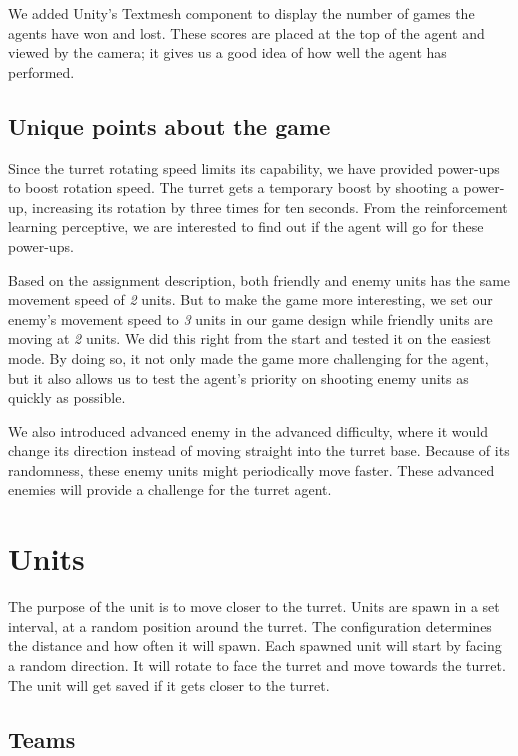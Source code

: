 \documentclass[conference]{IEEEtran}
\begin{document}
We added Unity's Textmesh component to display the number of games the agents have won and lost. These scores are placed at the top of the agent and viewed by the camera; it gives us a good idea of how well the agent has performed.

\subsection{Unique points about the game}

Since the turret rotating speed limits its capability, we have provided power-ups to boost rotation speed. The turret gets a temporary boost by shooting a power-up, increasing its rotation by three times for ten seconds. From the reinforcement learning perceptive, we are interested to find out if the agent will go for these power-ups.

Based on the assignment description, both friendly and enemy units has the same movement speed of \textit{2} units. But to make the game more interesting, we set our enemy's movement speed to \textit{3} units in our game design while friendly units are moving at \textit{2} units. We did this right from the start and tested it on the easiest mode. By doing so, it not only made the game more challenging for the agent, but it also allows us to test the agent's priority on shooting enemy units as quickly as possible.

We also introduced advanced enemy in the advanced difficulty, where it would change its direction instead of moving straight into the turret base. Because of its randomness, these enemy units might periodically move faster. These advanced enemies will provide a challenge for the turret agent.

\section{Units}

The purpose of the unit is to move closer to the turret. Units are spawn in a set interval, at a random position around the turret. The configuration determines the distance and how often it will spawn. Each spawned unit will start by facing a random direction. It will rotate to face the turret and move towards the turret. The unit will get saved if it gets closer to the turret.

\subsection{Teams}
\end{document}
